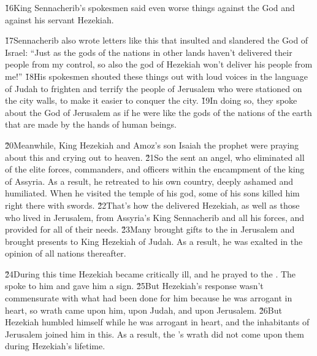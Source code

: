 \v{16}King Sennacherib's spokesmen said even worse things against the  God and against his servant Hezekiah.

\v{17}Sennacherib also wrote letters like this that insulted and slandered the  God of Israel: ``Just as the gods of the nations in other lands haven't delivered their people from my control, so also the god of Hezekiah won't deliver his people from me!'' \v{18}His spokesmen shouted these things out with loud voices in the language of Judah to frighten and terrify the people of Jerusalem who were stationed on the city walls, to make it easier to conquer the city. \v{19}In doing so, they spoke about the God of Jerusalem as if he were like the gods of the nations of the earth that are made by the hands of human beings.

\v{20}Meanwhile, King Hezekiah and Amoz's son Isaiah the prophet were praying about this and crying out to heaven. \v{21}So the  sent an angel, who eliminated all of the elite forces, commanders, and officers within the encampment of the king of Assyria. As a result, he retreated to his own country, deeply ashamed and humiliated. When he visited the temple of his god, some of his sons killed him right there with swords. \v{22}That's how the  delivered Hezekiah, as well as those who lived in Jerusalem, from Assyria's King Sennacherib and all his forces, and provided for all of their needs. \v{23}Many brought gifts to the  in Jerusalem and brought presents to King Hezekiah of Judah. As a result, he was exalted in the opinion of all nations thereafter.

\v{24}During this time Hezekiah became critically ill, and he prayed to the . The  spoke to him and gave him a sign. \v{25}But Hezekiah's response wasn't commensurate with what had been done for him because he was arrogant in heart, so wrath came upon him, upon Judah, and upon Jerusalem. \v{26}But Hezekiah humbled himself while he was arrogant in heart, and the inhabitants of Jerusalem joined him in this. As a result, the 's wrath did not come upon them during Hezekiah's lifetime.

